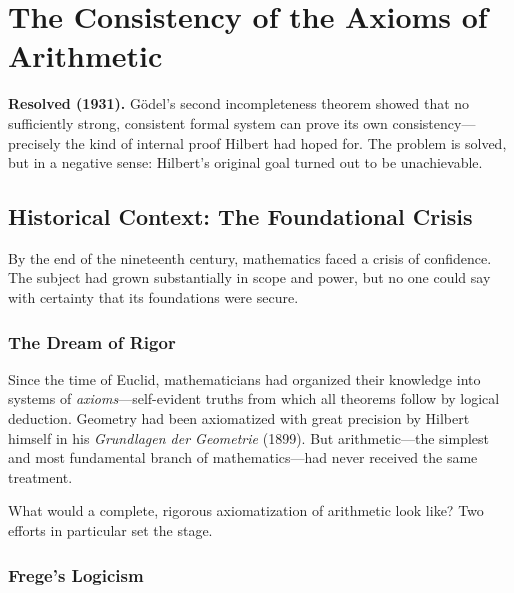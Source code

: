 
\chapter{The Consistency of the Axioms of Arithmetic}

\begin{solvedbox}
\textbf{Resolved (1931).} G\"odel's second incompleteness theorem showed that no sufficiently strong, consistent formal system can prove its own consistency---precisely the kind of internal proof Hilbert had hoped for. The problem is solved, but in a negative sense: Hilbert's original goal turned out to be unachievable.
\end{solvedbox}

\section{Historical Context: The Foundational Crisis}

By the end of the nineteenth century, mathematics faced a crisis of confidence. The subject had grown substantially in scope and power, but no one could say with certainty that its foundations were secure.

\subsection{The Dream of Rigor}

Since the time of Euclid, mathematicians had organized their knowledge into systems of \emph{axioms}---self-evident truths from which all theorems follow by logical deduction. Geometry had been axiomatized with great precision by Hilbert himself in his \emph{Grundlagen der Geometrie} (1899). But arithmetic---the simplest and most fundamental branch of mathematics---had never received the same treatment.

What would a complete, rigorous axiomatization of arithmetic look like? Two efforts in particular set the stage.

\subsection{Frege's Logicism}

